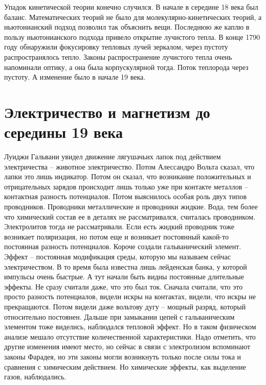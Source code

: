 \documentclass[a4paper, 12pt]{article}
\begin{document}
Упадок кинетической теории конечно случился. В начале в середине 18 века 
был баланс. Математических теорий не было для молекулярно-кинетических 
теорий, а ньютонианский подход позволил так объяснить вещи. Последнюю же 
каплю в пользу ньютонианского подхода привело открытие лучистого тепла. 
В конце 1790 году обнаружили фокусировку тепловых лучей зеркалом, через 
пустоту распространялось тепло. Законы распространение лучистого тепла 
очень напоминали оптику, а она была корпускулярной тогда. Поток 
теплорода через пустоту. А изменение было в начале 19 века.


\section{Электричество и магнетизм до середины 19 века}

Луиджи Гальвани увидел движение лягушачьих лапок под действием 
электричества -- животное электричество. Потом Алессандро Вольта 
сказал, что лапки это лишь индикатор. Потом он сказал, что возникание 
положительных и отрицательных зарядов происходит лишь только уже при 
контакте металлов -- контактная разность потенциалов. Потом выяснилось 
особая роль двух типов проводников. Проводники металлические 
и проводники жидкие. Вода, тем более что химический состав ее в деталях 
не рассматривался, считалась проводником. Электролитов тогда не 
рассматривали. Если есть жидкий проводник тоже возникает поляризация, 
но потом еще и возникает постоянный какой-то постоянная разность 
потенциалов. Короче создали гальванический элемент. Эффект -- 
постоянная модификация среды, которую мы называем сейчас 
электричеством. В то время была известна лишь лейденская банка, 
у которой импульсы очень быстрые. А тут начали быть видны постоянные 
длительные эффекты. Не сразу считали даже, что это был ток. Сначала 
считали, что это просто разность потенциалов, видели искры на 
контактах, видели, что искры не прекращаются. Потом видели даже 
вольтову дугу -- мощный разряд, который относительно постоянен. Дальше 
при замыкании цепей с гальваническим элементом тоже виделись, 
наблюдался тепловой эффект. Но в таком физическом анализе мешало 
отсутствие количественной характеристики. Надо отметить, что другие 
изменения имеют место, но сейчас в связи с электролизом вспоминают 
законы Фарадея, но эти законы могли возникнуть только после силы тока 
и сравнения с химическим действием. Но химические эффекты, как 
выделение газов, наблюдались. 
\end{document}

